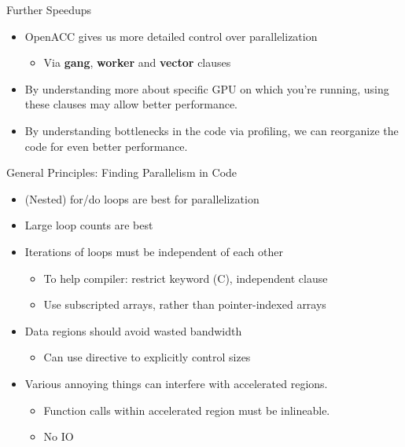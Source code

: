 \documentclass[c,mathserif,compress,xcolor=svgnames]{beamer}
\newenvironment{bblock}[0]
{
\begin{beamerboxesrounded}[upper=uppercol1,lower=lowercol1,shadow=true]}
{\end{beamerboxesrounded}}
\begin{document}
\begin{frame}{\small Further Speedups}
  \begin{bblock}{}
    \begin{itemize}
      \item OpenACC gives us more detailed control over parallelization
      \begin{itemize}
        \item Via \textbf{gang}, \textbf{worker} and \textbf{vector} clauses
      \end{itemize}
      \item By understanding more about specific GPU on which you're running, using these clauses may allow better performance.
      \item By understanding bottlenecks in the code via profiling, we can reorganize the code for even better performance.
    \end{itemize}
  \end{bblock}
\end{frame}

\begin{frame}{\small General Principles: Finding Parallelism in Code}
  \begin{itemize}
    \item (Nested) for/do loops are best for parallelization
    \item Large loop counts are best
    \item Iterations of loops must be independent of each other
    \begin{itemize}
      \item To help compiler: restrict keyword (C), independent clause
      \item Use subscripted arrays, rather than pointer-indexed arrays
    \end{itemize}
    \item Data regions should avoid wasted bandwidth
    \begin{itemize}
      \item Can use directive to explicitly control sizes
    \end{itemize}
    \item Various annoying things can interfere with accelerated regions.
    \begin{itemize}
      \item Function calls within accelerated region must be inlineable.
      \item No IO
    \end{itemize}
  \end{itemize}
\end{frame}
\end{document}
